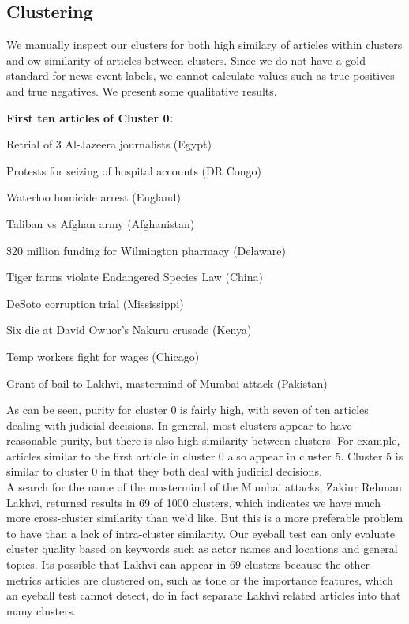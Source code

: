 
\subsection{Clustering}

We manually inspect our clusters for both high similary of articles within clusters and ow similarity of articles between clusters. Since we do not have a gold standard for news event labels, we cannot calculate values such as true positives and true negatives. We present some qualitative results.

\textbf{First ten articles of Cluster 0:}  
\begin{compactitem}
\item Retrial of 3 Al-Jazeera journalists (Egypt)
\item Protests for seizing of hospital accounts (DR Congo)
\item Waterloo homicide arrest (England)
\item Taliban vs Afghan army (Afghanistan)
\item \$20 million funding for Wilmington pharmacy (Delaware)
\item Tiger farms violate Endangered Species Law (China)
\item DeSoto corruption trial (Mississippi)
\item Six die at David Owuor's Nakuru crusade (Kenya)
\item Temp workers fight for wages (Chicago)
\item Grant of bail to Lakhvi, mastermind of Mumbai attack (Pakistan)
\end{compactitem}

As can be seen, purity for cluster 0 is fairly high, with seven of ten articles dealing with judicial decisions. In general, most clusters appear to have reasonable purity, but there is also high similarity between clusters. For example, articles similar to the first article in cluster 0 also appear in cluster 5. Cluster 5 is similar to cluster 0 in that they both deal with judicial decisions.\\

\noindent A search for the name of the mastermind of the Mumbai attacks, Zakiur Rehman Lakhvi, returned results in 69 of 1000 clusters, which indicates we have much more cross-cluster similarity than we'd like. But this is a more preferable problem to have than a lack of intra-cluster similarity. Our eyeball test can only evaluate cluster quality based on keywords such as actor names and locations and general topics. Its possible that Lakhvi can appear in 69 clusters because the other metrics articles are clustered on, such as tone or the importance features, which an eyeball test cannot detect, do in fact separate Lakhvi related articles into that many clusters.

